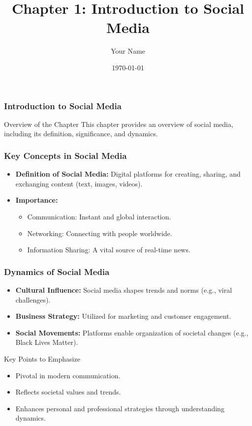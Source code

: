 \documentclass{beamer}
\title{Chapter 1: Introduction to Social Media}
\author{Your Name}
\institute{Your Institution}
\date{\today}
\begin{document}
\frame{\titlepage}

\begin{frame}[fragile]
    \frametitle{Introduction to Social Media}
    \begin{block}{Overview of the Chapter}
        This chapter provides an overview of social media, including its definition, significance, and dynamics.
    \end{block}
\end{frame}

\begin{frame}[fragile]
    \frametitle{Key Concepts in Social Media}
    \begin{itemize}
        \item \textbf{Definition of Social Media:} Digital platforms for creating, sharing, and exchanging content (text, images, videos).
        \item \textbf{Importance:}
        \begin{itemize}
            \item Communication: Instant and global interaction.
            \item Networking: Connecting with people worldwide.
            \item Information Sharing: A vital source of real-time news.
        \end{itemize}
    \end{itemize}
\end{frame}

\begin{frame}[fragile]
    \frametitle{Dynamics of Social Media}
    \begin{itemize}
        \item \textbf{Cultural Influence:} Social media shapes trends and norms (e.g., viral challenges).
        \item \textbf{Business Strategy:} Utilized for marketing and customer engagement.
        \item \textbf{Social Movements:} Platforms enable organization of societal changes (e.g., Black Lives Matter).
    \end{itemize}
    \begin{block}{Key Points to Emphasize}
        \begin{itemize}
            \item Pivotal in modern communication.
            \item Reflects societal values and trends.
            \item Enhances personal and professional strategies through understanding dynamics.
        \end{itemize}
    \end{block}
\end{frame}
\end{document}
